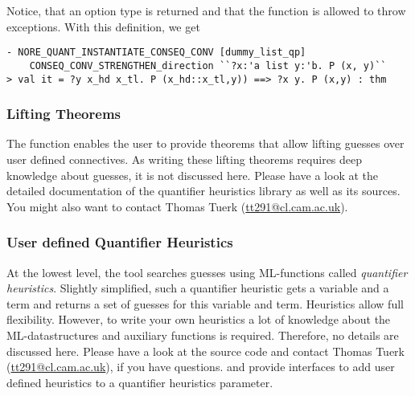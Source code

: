 \noindent
Notice, that an option type is returned and that the function is
allowed to throw  exceptions.
With this definition, we get

\begin{session}
\begin{verbatim}
- NORE_QUANT_INSTANTIATE_CONSEQ_CONV [dummy_list_qp]
    CONSEQ_CONV_STRENGTHEN_direction ``?x:'a list y:'b. P (x, y)``
> val it = ?y x_hd x_tl. P (x_hd::x_tl,y)) ==> ?x y. P (x,y) : thm
\end{verbatim}
\end{session}

\subsubsection{Lifting Theorems}

The function  enables the
user to provide theorems that allow lifting guesses over
user defined connectives. As writing these lifting theorems requires
deep knowledge about guesses, it is not discussed here. Please have a
look at the detailed documentation of the quantifier heuristics library as
well as its sources. You might also want to contact
Thomas Tuerk (\url{tt291@cl.cam.ac.uk}).


\subsubsection{User defined Quantifier Heuristics}

At the lowest level, the tool searches guesses using ML-functions
called \emph{quantifier heuristics}. Slightly simplified, such a
quantifier heuristic gets a variable and a term and returns a set of
guesses for this variable and term. Heuristics allow full
flexibility. However, to write your own heuristics a lot of knowledge
about the ML-datastructures and auxiliary functions is
required. Therefore, no details are discussed here. Please have a look
at the source code and contact Thomas Tuerk
(\url{tt291@cl.cam.ac.uk}), if you have questions.
 and  provide
interfaces to add user defined heuristics to a quantifier heuristics
parameter.



